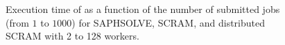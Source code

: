 \begin{figure}[htbp]
  \centering
  
  \caption{Execution time of as a function of the number of submitted jobs (from $1$ to $1000$) for SAPHSOLVE, SCRAM, and distributed SCRAM with 2 to 128 workers.}
  \label{fig:performance}
\end{figure}